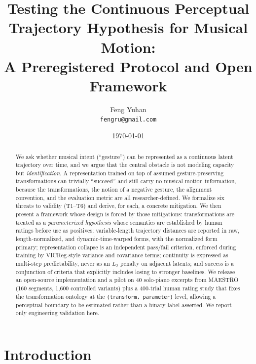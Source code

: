 \documentclass[11pt]{article}
\title{Testing the Continuous Perceptual Trajectory Hypothesis for Musical Motion:\\
A Preregistered Protocol and Open Framework}
\author{Feng Yuhan\\ \texttt{fengru@gmail.com}}
\date{\today}
\begin{document}
\maketitle

\begin{abstract}
We ask whether musical intent (``gesture'') can be represented as a continuous
latent trajectory over time, and we argue that the central obstacle is not
modeling capacity but \emph{identification}. A representation trained on top of
assumed gesture-preserving transformations can trivially ``succeed'' and still
carry no musical-motion information, because the transformations, the notion of a
negative gesture, the alignment convention, and the evaluation metric are all
researcher-defined. We formalize six threats to validity (T1--T6) and derive, for
each, a concrete mitigation. We then present a framework whose design is forced by
those mitigations: transformations are treated as a \emph{parameterized
hypothesis} whose semantics are established by human ratings before use as
positives; variable-length trajectory distances are reported in raw,
length-normalized, and dynamic-time-warped forms, with the normalized form
primary; representation collapse is an independent pass/fail criterion, enforced
during training by VICReg-style variance and covariance terms; continuity is
expressed as multi-step predictability, never as an $L_2$ penalty on adjacent
latents; and success is a conjunction of criteria that explicitly includes losing
to stronger baselines. We release an open-source implementation and a pilot on 40
solo-piano excerpts from MAESTRO (160 segments, 1{,}600 controlled variants) plus
a 400-trial human rating study that fixes the transformation ontology at the
\texttt{(transform, parameter)} level, allowing a perceptual boundary to be
estimated rather than a binary label asserted. We report only engineering
validation here.
\end{abstract}

\section{Introduction}
\end{document}
